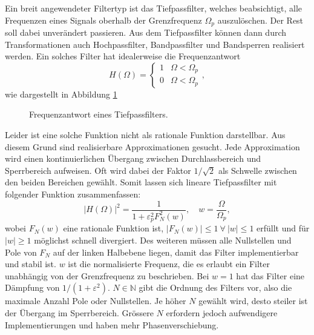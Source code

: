 Ein breit angewendeter Filtertyp ist das Tiefpassfilter, welches beabsichtigt, alle Frequenzen eines Signals oberhalb der Grenzfrequenz $\Omega_p$ auszulöschen.
Der Rest soll dabei unverändert passieren.
Aus dem Tiefpassfilter können dann durch Transformationen auch Hochpassfilter, Bandpassfilter und Bandsperren realisiert werden.
Ein solches Filter hat idealerweise die Frequenzantwort
\begin{equation}
    H(\Omega) =
    \begin{cases}
        1  & \Omega < \Omega_p \\
        0  & \Omega < \Omega_p
    \end{cases},
\end{equation}
wie dargestellt in Abbildung \ref{ellfilter:fig:lp}
\begin{figure}
    \centering
    
    \caption{Frequenzantwort eines Tiefpassfilters.}
    \label{ellfilter:fig:lp}
\end{figure}
Leider ist eine solche Funktion nicht als rationale Funktion darstellbar.
Aus diesem Grund sind realisierbare Approximationen gesucht.
Jede Approximation wird einen kontinuierlichen Übergang zwischen Durchlassbereich und Sperrbereich aufweisen.
Oft wird dabei der Faktor $1/\sqrt{2}$ als Schwelle zwischen den beiden Bereichen gewählt.
Somit lassen sich lineare Tiefpassfilter mit folgender Funktion zusammenfassen:
\begin{equation} \label{ellfilter:eq:quadratic_transfer}
    | H(\Omega)|^2 = \frac{1}{1 + \varepsilon_p^2 F_N^2(w)}, \quad w=\frac{\Omega}{\Omega_p},
\end{equation}
wobei $F_N(w)$ eine rationale Funktion ist, $|F_N(w)| \leq 1 ~\forall~ |w| \leq 1$ erfüllt und für $|w| \geq 1$ möglichst schnell divergiert.
Des weiteren müssen alle Nullstellen und Pole von $F_N$ auf der linken Halbebene liegen, damit das Filter implementierbar und stabil ist.
$w$ ist die normalisierte Frequenz, die es erlaubt ein Filter unabhängig von der Grenzfrequenz zu beschrieben.
Bei $w=1$ hat das Filter eine Dämpfung von $1/(1+\varepsilon^2)$.
$N \in \mathbb{N} $ gibt die Ordnung des Filters vor, also die maximale Anzahl Pole oder Nullstellen.
Je höher $N$ gewählt wird, desto steiler ist der Übergang im Sperrbereich.
Grössere $N$ erfordern jedoch aufwendigere Implementierungen und haben mehr Phasenverschiebung.

